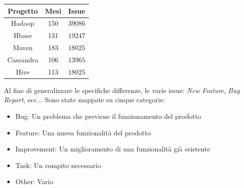 \documentclass[%
    corpo=12pt,
    twoside,
    oldstyle,
    autoretitolo,
    greek,
    evenboxes,
]{toptesi}
\begin{document}
\begin{center}
   \label{tab:seoss33_selected}
  \begin{tabular}{ |c|c|c| }
     \hline
     \textbf{Progetto} & \textbf{Mesi} & \textbf{Issue} \\
     \hline
     \hline
     Hadoop & 150 & $39086$ \\
     Hbase & 131 & $19247$ \\
     Maven & 183 & $18025$ \\
     Cassandra & 106 & $13965$ \\
     Hive & 113 & $18025$ \\
     \hline
  \end{tabular}
\end{center}

Al fine di generalizzare le specifiche differenze, le varie issue: \textit{New Feature}, \textit{Bug Report}, ecc... Sono state mappate su cinque categorie:
\begin{itemize}
  \item Bug: Un problema che previene il funzionamento del prodotto
  \item Feature: Una nuova funzionalità del prodotto
  \item Improvement: Un miglioramento di una funzionalità già esistente
  \item Task: Un compito necessario
  \item Other: Vario
\end{itemize}
\end{document}
